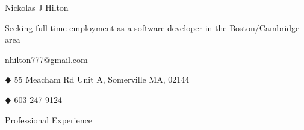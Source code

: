 \documentclass{article}
\newcommand{\lineseparator}[1]{\noindent\makebox[\linewidth]{\rule{\textwidth}{#1}}}
\begin{document}
\begin{minipage}[t]{0.35\textwidth}
  \hspace{-6.5mm}
  {\Huge Nickolas J Hilton }
\end{minipage}
\hspace{-6.5mm}
\begin{minipage}[b]{0.65\textwidth}
  \begin{flushright}
    {\small Seeking full-time employment as a software developer in the Boston/Cambridge area }
  \end{flushright}
\end{minipage}
\vspace{1mm}
\lineseparator{1.5pt}
\vspace{-2mm}
\begin{center}
  nhilton777@gmail.com 
  \begin{inparaitem}
  \item[$\vardiamond$] 55 Meacham Rd Unit A, Somerville MA, 02144
  \item[$\vardiamond$] 603-247-9124 
  \end{inparaitem}
\end{center}
{\Large Professional Experience } \\
\lineseparator{0.5pt}
\\[7mm]
\end{document}
